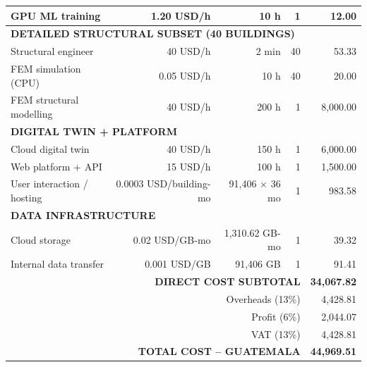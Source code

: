 \begin{longtable}{lrrrr}
GPU ML training & 1.20 USD/h & 10 h & 1 & 12.00 \\
\hline

\multicolumn{5}{l}{\textbf{DETAILED STRUCTURAL SUBSET (40 BUILDINGS)}} \\

Structural engineer & 40 USD/h & 2 min & 40 & 53.33 \\
FEM simulation (CPU) & 0.05 USD/h & 10 h & 40 & 20.00 \\
FEM structural modelling & 40 USD/h & 200 h & 1 & 8,000.00 \\
\hline

\multicolumn{5}{l}{\textbf{DIGITAL TWIN + PLATFORM}} \\

Cloud digital twin & 40 USD/h & 150 h & 1 & 6,000.00 \\
Web platform + API & 15 USD/h & 100 h & 1 & 1,500.00 \\
User interaction / hosting & 0.0003 USD/building-mo & 91,406 × 36 mo & 1 & 983.58 \\
\hline

\multicolumn{5}{l}{\textbf{DATA INFRASTRUCTURE}} \\

Cloud storage & 0.02 USD/GB-mo & 1,310.62 GB-mo & 1 & 39.32 \\
Internal data transfer & 0.001 USD/GB & 91,406 GB & 1 & 91.41 \\
\hline

\multicolumn{4}{r}{\textbf{DIRECT COST SUBTOTAL}} & \textbf{34,067.82} \\
\hline
\multicolumn{4}{r}{Overheads (13\%)} & 4,428.81 \\
\multicolumn{4}{r}{Profit (6\%)} & 2,044.07 \\
\multicolumn{4}{r}{VAT (13\%)} & 4,428.81 \\
\hline
\multicolumn{4}{r}{\textbf{TOTAL COST – GUATEMALA}} & \textbf{44,969.51} \\
\hline

\end{longtable}

















